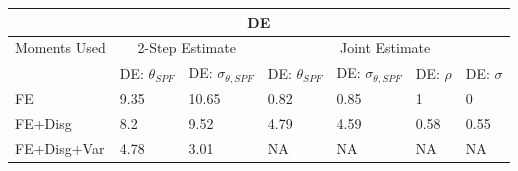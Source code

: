 \documentclass[12pt]{article}
\begin{document}
\begin{table}[p]
\begin{tabular}{lllllll}
		\hline 
		\multicolumn{7}{c}{DE}                                                                                                                                     \\
		\hline 
		Moments Used & \multicolumn{2}{c}{2-Step Estimate}                     & \multicolumn{4}{c}{Joint Estimate}                                                \\
		\hline 
		& DE: $\theta_{SPF}$         & DE: $\sigma_{\theta,SPF}$  & DE: $\theta_{SPF}$        & DE: $\sigma_{\theta,SPF}$ & DE: $\rho$ & DE: $\sigma$ \\
		\hline 
		FE       & 9.35                       & 10.65                      & 0.82                      & 0.85                      & 1          & 0            \\
		FE+Disg      & 8.2                        & 9.52                       & 4.79                      & 4.59                      & 0.58       & 0.55         \\
		FE+Disg+Var  & 4.78                       & 3.01                       & NA                        & NA                        & NA         & NA          \\
		\hline 
	\end{tabular}
\end{table}
\end{document}
